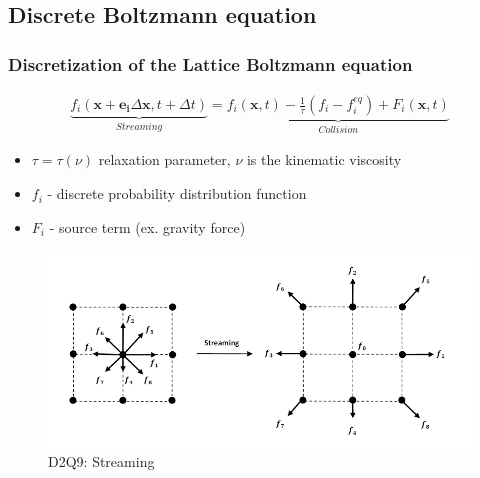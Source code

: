\documentclass[10pt]{beamer}
\begin{document}
\subsection{Discrete Boltzmann equation}
\begin{frame}\frametitle{Discretization of the Lattice Boltzmann equation}
\pause
\begin{eqnarray} 
  \underbrace{ f_i(\bm{x} + \bm{e_i} \Delta {\bm{x}}, t +  \Delta {t} ) }_{Streaming} =
  \underbrace{ f_i(\bm{x}, t ) - \frac{1}{\tau } ( f_i - f_i^{eq}) + F_i(\bm{x}, t ) }_{Collision} \nonumber
\end{eqnarray}
\begin{itemize}
\item  $\tau = \tau(\nu)$ relaxation parameter, $\nu$ is the kinematic viscosity 
\item $f_i$ - discrete probability distribution function
\item $F_i$ - source term (ex. gravity force)
\end{itemize}
\begin{figure}
  \begin{minipage}[c]{0.6\textwidth}
    \includegraphics[width=\textwidth]{obrazki/streaming.png} 
  \end{minipage}\hfill
  \begin{minipage}[c]{0.4\textwidth} %
    \caption{D2Q9: Streaming} \label{fig:Streaming}
  \end{minipage}
\end{figure}
\end{frame} 
\end{document}
